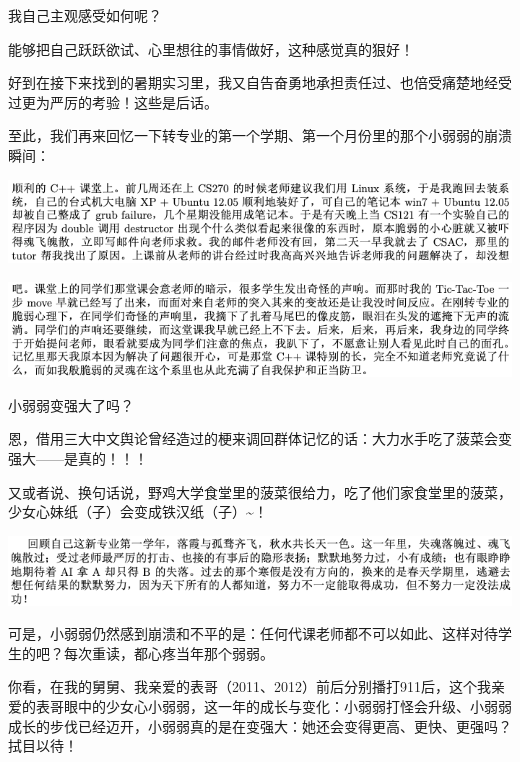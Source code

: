 \documentclass[9pt, b5paper]{article}
\begin{document}
我自己主观感受如何呢？

能够把自己跃跃欲试、心里想往的事情做好，这种感觉真的狠好！

好到在接下来找到的暑期实习里，我又自告奋勇地承担责任过、也倍受痛楚地经受过更为严厉的考验！这些是后话。 

至此，我们再来回忆一下转专业的第一个学期、第一个月份里的那个小弱弱的崩溃瞬间：

\begin{center}
\includegraphics[width=.9\linewidth]{./pic/backups_plans_20210501_214324.png}
\end{center}

\begin{center}
\includegraphics[width=.9\linewidth]{./pic/backups_plans_20210501_214449.png}
\end{center}

小弱弱变强大了吗？

恩，借用三大中文舆论曾经造过的梗来调回群体记忆的话：大力水手吃了菠菜会变强大——是真的！！！

又或者说、换句话说，野鸡大学食堂里的菠菜很给力，吃了他们家食堂里的菠菜，少女心妹纸（子）会变成铁汉纸（子）\textasciitilde{}！

\begin{center}
\includegraphics[width=.9\linewidth]{./pic/backups_plans_20210501_225803.png}
\end{center}

可是，小弱弱仍然感到崩溃和不平的是：任何代课老师都不可以如此、这样对待学生的吧？每次重读，都心疼当年那个弱弱。

你看，在我的舅舅、我亲爱的表哥（2011、2012）前后分别播打911后，这个我亲爱的表哥眼中的少女心小弱弱，这一年的成长与变化：小弱弱打怪会升级、小弱弱成长的步伐已经迈开，小弱弱真的是在变强大：她还会变得更高、更快、更强吗？拭目以待！
\end{document}
